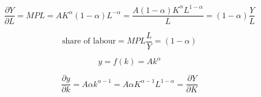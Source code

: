 \[\frac{\partial Y}{\partial L} = MPL = {AK}^{\alpha}(1 - \alpha)L^{- \alpha} = \frac{{A(1 - \alpha)K}^{\alpha}L^{1 - \alpha}}{L} = (1 - \alpha)\frac{Y}{L}\]

\[\text{share of labour} = MPL\frac{L}{Y} = (1 - \alpha)\]

\[y = f(k) = {Ak}^{\alpha}\]

\[\frac{\partial y}{\partial k} = {A\alpha k}^{\alpha - 1} = A\alpha K^{\alpha - 1}L^{1 - \alpha} = \frac{\partial Y}{\partial K}\]
